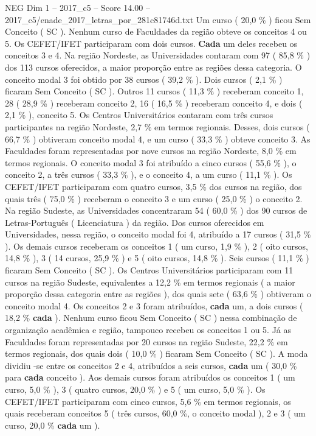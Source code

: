 \begin{textsample}{NEG Dim 1 – 2017\_c5 – Score 14.00 – 2017\_c5/enade\_2017\_letras\_por\_281c81746d.txt}
Um curso ( 20,0 \% ) ficou Sem Conceito ( SC ).
Nenhum curso de Faculdades da região obteve os conceitos 4 ou 5.
Os CEFET/IFET participaram com dois cursos. \textbf{Cada} um deles recebeu os conceitos 3 e 4.
Na região Nordeste, as Universidades contaram com 97 ( 85,8 \% ) dos 113 cursos oferecidos, a maior proporção entre as regiões dessa categoria.
O conceito modal 3 foi obtido por 38 cursos ( 39,2 \% ).
Dois cursos ( 2,1 \% ) ficaram Sem Conceito ( SC ).
Outros 11 cursos ( 11,3 \% ) receberam conceito 1, 28 ( 28,9 \% ) receberam conceito 2, 16 ( 16,5 \% ) receberam conceito 4, e dois ( 2,1 \% ), conceito 5.
Os Centros Universitários contaram com três cursos participantes na região Nordeste, 2,7 \% em termos regionais.
Desses, dois cursos ( 66,7 \% ) obtiveram conceito modal 4, e um curso ( 33,3 \% ) obteve conceito 3.
As Faculdades foram representadas por nove cursos na região Nordeste, 8,0 \% em termos regionais.
O conceito modal 3 foi atribuído a cinco cursos ( 55,6 \% ), o conceito 2, a três cursos ( 33,3 \% ), e o conceito 4, a um curso ( 11,1 \% ).
Os CEFET/IFET participaram com quatro cursos, 3,5 \% dos cursos na região, dos quais três ( 75,0 \% ) receberam o conceito 3 e um curso ( 25,0 \% ) o conceito 2.
Na região Sudeste, as Universidades concentraram 54 ( 60,0 \% ) dos 90 cursos de Letras-Português ( Licenciatura ) da região.
Dos cursos oferecidos em Universidades, nessa região, o conceito modal foi 4, atribuído a 17 cursos ( 31,5 \% ).
Os demais cursos receberam os conceitos 1 ( um curso, 1,9 \% ), 2 ( oito cursos, 14,8 \% ), 3 ( 14 cursos, 25,9 \% ) e 5 ( oito cursos, 14,8 \% ).
Seis cursos ( 11,1 \% ) ficaram Sem Conceito ( SC ).
Os Centros Universitários participaram com 11 cursos na região Sudeste, equivalentes a 12,2 \% em termos regionais ( a maior proporção dessa categoria entre as regiões ), dos quais sete ( 63,6 \% ) obtiveram o conceito modal 4.
Os conceitos 2 e 3 foram atribuídos, \textbf{cada} um, a dois cursos ( 18,2 \% \textbf{cada} ).
Nenhum curso ficou Sem Conceito ( SC ) nessa combinação de organização acadêmica e região, tampouco recebeu os conceitos 1 ou 5.
Já as Faculdades foram representadas por 20 cursos na região Sudeste, 22,2 \% em termos regionais, dos quais dois ( 10,0 \% ) ficaram Sem Conceito ( SC ).
A moda dividiu -se entre os conceitos 2 e 4, atribuídos a seis cursos, \textbf{cada} um ( 30,0 \% para \textbf{cada} conceito ).
Aos demais cursos foram atribuídos os conceitos 1 ( um curso, 5,0 \% ), 3 ( quatro cursos, 20,0 \% ) e 5 ( um curso, 5,0 \% ).
Os CEFET/IFET participaram com cinco cursos, 5,6 \% em termos regionais, os quais receberam conceitos 5 ( três cursos, 60,0 \%, o conceito modal ), 2 e 3 ( um curso, 20,0 \% \textbf{cada} um ).

\end{textsample}
